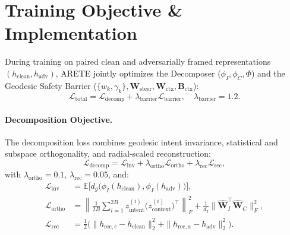 \documentclass[11pt,twocolumn,a4paper]{article}
\begin{document}
\section{Training Objective \& Implementation}
\label{sec:architecture}

During training on paired clean and adversarially framed representations $(h_{\text{clean}}, h_{\text{adv}})$, ARETE jointly optimizes the Decomposer ($\phi_I, \phi_C, \Phi$) and the Geodesic Safety Barrier ($\{w_k, \gamma_k\}, \mathbf{W}_{\text{steer}}, \mathbf{W}_{\text{ctx}}, \mathbf{B}_{\text{ctx}}$):
\begin{equation}
    \mathcal{L}_{\text{total}} = \mathcal{L}_{\text{decomp}} + \lambda_{\text{barrier}}\mathcal{L}_{\text{barrier}}, \quad \lambda_{\text{barrier}} = 1.2.
\end{equation}

\paragraph{Decomposition Objective.}
The decomposition loss combines geodesic intent invariance, statistical and subspace orthogonality, and radial-scaled reconstruction:
\begin{equation}
    \mathcal{L}_{\text{decomp}} = \mathcal{L}_{\text{inv}} + \lambda_{\text{ortho}}\mathcal{L}_{\text{ortho}} + \lambda_{\text{rec}}\mathcal{L}_{\text{rec}},
\end{equation}
with $\lambda_{\text{ortho}} = 0.1$, $\lambda_{\text{rec}} = 0.05$, and:
\begin{align}
    \mathcal{L}_{\text{inv}} &= \mathbb{E}\Big[d_g\big(\phi_I(h_{\text{clean}}), \phi_I(h_{\text{adv}})\big)\Big], \\
    \mathcal{L}_{\text{ortho}} &= \left\|\frac{1}{2B}\sum_{i=1}^{2B} z_{\text{intent}}^{(i)}\big(z_{\text{context}}^{(i)}\big)^\top\right\|_F^2 + \frac{1}{d_I}\big\|\hat{\mathbf{W}}_I^\top \hat{\mathbf{W}}_C\big\|_F^2, \\
    \mathcal{L}_{\text{rec}} &= \frac{1}{2}\Big(\|h_{\text{rec},c} - h_{\text{clean}}\|_2^2 + \|h_{\text{rec},a} - h_{\text{adv}}\|_2^2\Big).
\end{align}
\end{document}
